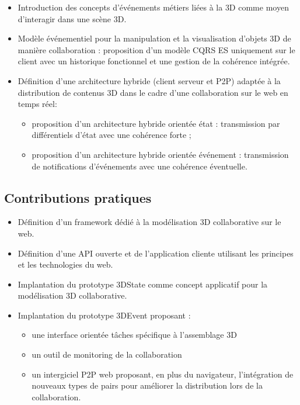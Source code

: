 \begin{itemize}

	\item Introduction des concepts d'événements métiers liées à la \gls{3D} 
	comme moyen d'interagir dans une scène \gls{3D}.
	\item Modèle événementiel pour la manipulation et la visualisation d'objets 3D de manière collaboration : proposition d'un modèle CQRS ES uniquement sur le client avec un historique fonctionnel et une gestion de la cohérence intégrée.
	\item Définition d'une architecture hybride (client serveur et \gls{P2P}) adaptée à 
	la distribution de contenus \gls{3D} dans le cadre d'une collaboration sur le web en 
	temps réel:
	\begin{itemize}
		\item proposition d'un architecture hybride orientée état : transmission par différentiels d'état avec une cohérence forte ;
	    \item proposition d'un architecture hybride orientée événement : transmission de notifications d'événements avec une cohérence éventuelle.
	\end{itemize}
	
\end{itemize}
\subsection{Contributions pratiques}
\begin{itemize}

	\item Définition d'un framework dédié à la modélisation 3D collaborative sur le web.
	\item Définition d'une API ouverte et de l'application cliente utilisant les principes et les technologies du web.
	\item Implantation du prototype 3DState comme concept applicatif pour la modélisation 3D collaborative.
	\item Implantation du prototype 3DEvent proposant :
	\begin{itemize}
	    \item une interface orientée tâches spécifique à l'assemblage 3D
    	\item un outil de monitoring de la collaboration
    	\item un intergiciel P2P web proposant, en plus du navigateur, l'intégration de nouveaux types de pairs pour améliorer la distribution lors de la collaboration.
	\end{itemize}
\end{itemize}


